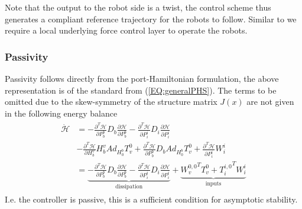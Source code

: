 \documentclass[a4paper,twoside, openright,12pt]{report}
\begin{document}
Note that the output to the robot side is a twist, the control scheme thus generates a compliant reference trajectory for the robots to follow. Similar to \cite{Caccavale_08} we require a local underlying force control layer to operate the robots.
\subsubsection{Passivity}
Passivity follows directly from the port-Hamiltonian formulation, the above representation is of the standard from (\ref{EQ:generalPHS}). The terms to be omitted due to the skew-symmetry of the structure matrix $J(x)$ are not given in the following energy balance
\begin{eqnarray}
\begin{aligned}
\dot{\mathcal{H}} &= -\frac{\partial^T \mathcal{H}}{\partial P_b^b}D_b\frac{\partial \mathcal{H}}{\partial P_b^b} - \frac{\partial^T \mathcal{H}}{\partial P_i^i}D_i\frac{\partial \mathcal{H}}{\partial P_i^i} \\ 
&- \frac{\partial^T \mathcal{H}}{\partial H_b^v}H_b^v Ad_{H_0^b}T_v^0 +\frac{\partial^T \mathcal{H}}{\partial P_b^b}D_b Ad_{H_0^b}T_v^0 + \frac{\partial^T \mathcal{H}}{\partial P_i^i}W_i^i  \\
&= \underbrace{-\frac{\partial^T \mathcal{H}}{\partial P_b^b}D_b\frac{\partial \mathcal{H}}{\partial P_b^b} - \frac{\partial^T \mathcal{H}}{\partial P_i^i}D_i\frac{\partial \mathcal{H}}{\partial P_i^i}}_{\text{dissipation}} + \underbrace{{W_v^{0,0}}^T T_v^0 + {T_i^{i,0}}^T W_i^i}_{\text{inputs}}
\end{aligned}
\end{eqnarray}
I.e. the controller is passive, this is a sufficient condition for asymptotic stability.
\end{document}
